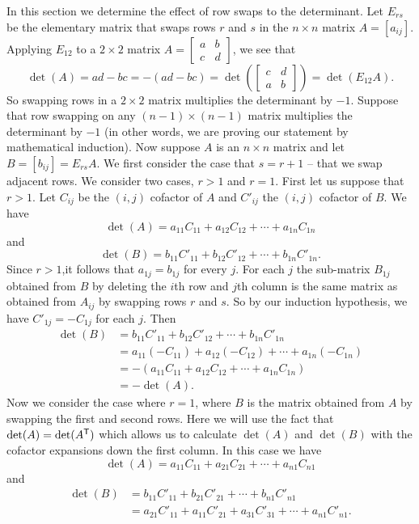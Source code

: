 In this section we determine the effect of row swaps to the determinant. Let $E_{rs}$ be the elementary matrix that swaps rows $r$ and $s$ in the $n \times n$ matrix $A=[a_{ij}]$. Applying $E_{12}$ to a $2 \times 2$ matrix $A = \left[ \begin{array}{cc} a & b \\ c & d \end{array} \right]$, we see that 
\[\det(A) = ad - bc = -(ad-bc) = \det\left(\left[ \begin{array}{cc} c & d \\ a & b \end{array} \right]\right) = \det(E_{12}A).\]
So swapping rows in a $2 \times 2$ matrix multiplies the determinant by $-1$. Suppose that row swapping on any $(n-1) \times (n-1)$ matrix multiplies the determinant by $-1$ (in other words, we are proving our statement by mathematical induction). Now suppose $A$ is an $n \times n$ matrix and let $B = [b_{ij}] = E_{rs}A$. We first consider the case that $s = r+1$ -- that we swap adjacent rows. We consider two cases, $r > 1$ and $r = 1$. First let us suppose that $r > 1$. Let $C_{ij}$ be the $(i,j)$ cofactor of $A$ and $C'_{ij}$ the $(i,j)$ cofactor of $B$. We have
\[\det(A) = a_{11}C_{11} + a_{12}C_{12} + \cdots + a_{1n}C_{1n}\]
and
\[\det(B) = b_{11}C'_{11} + b_{12}C'_{12} + \cdots + b_{1n}C'_{1n}.\]
Since $r > 1$,it follows that $a_{1j} = b_{1j}$ for every $j$. For each $j$ the sub-matrix $B_{1j}$ obtained from $B$ by deleting the $i$th row and $j$th column is the same matrix as obtained from $A_{ij}$ by swapping rows $r$ and $s$. So by our induction hypothesis, we have $C'_{1j} = -C_{1j}$ for each $j$. Then
\begin{align*}
\det(B) &= b_{11}C'_{11} + b_{12}C'_{12} + \cdots + b_{1n}C'_{1n} \\
	&= a_{11}(-C_{11}) + a_{12}(-C_{12}) + \cdots + a_{1n}(-C_{1n}) \\
	&= -(a_{11}C_{11} + a_{12}C_{12} + \cdots + a_{1n}C_{1n}) \\
	&= -\det(A).
\end{align*}
Now we consider the case where $r=1$, where $B$ is the matrix obtained from $A$ by swapping the first and second rows. Here we will use the fact that $\det(A) = \det(A^{\mathsf{T}})$ which allows us to calculate $\det(A)$ and $\det(B)$ with the cofactor expansions down the first column. In this case we have 
\[\det(A) = a_{11}C_{11} + a_{21}C_{21} + \cdots + a_{n1}C_{n1}\]
and
\begin{align*}
\det(B) &= b_{11}C'_{11} + b_{21}C'_{21} + \cdots + b_{n1}C'_{n1} \\
	&= a_{21}C'_{11} + a_{11}C'_{21} + a_{31}C'_{31} + \cdots + a_{n1}C'_{n1}.
\end{align*}
